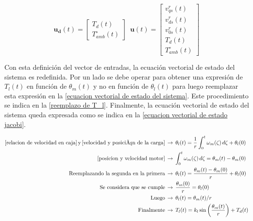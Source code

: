 \documentclass[a4paper, 10pt, onecolumn,journal]{ieeeconf}
\begin{document}
\begin{equation}
    \mathbf{u_{d}}(t) = \begin{bmatrix} T_d(t) \\ T_{amb}^{\circ}(t)\end{bmatrix}\, \, \, 
    \mathbf{u}(t) = \begin{bmatrix} v^r_{qs}(t) \\ v^r_{ds}(t) \\ v^r_{0s}(t) \\ T_d(t) \\ T_{amb}^{\circ}(t) \end{bmatrix}
    \label{vector de entradas jacobi linealizado}
\end{equation}

Con esta definición del vector de entradas, la ecuación vectorial de estado del sistema es redefinida.
Por un lado se debe operar para obtener una expresión de $T_l(t)$ en función de $\theta_m(t)$ y no en función de 
$\theta_l(t)$ para luego reemplazar esta expresión en la \cref{ecuacion vectorial de estado del sistema}.
Este procedimiento se indica en la \cref{reemplazo de T_l}. Finalmente, la ecuación vectorial de estado del sistema queda expresada
como se indica en la \cref{ecuacion vectorial de estado jacobi}.

\begin{equation}
    \begin{aligned}
        \cref{relacion de velocidad en caja} \,\text{y}\, \cref{velocidad y posición de la carga}\,&\rightarrow\,\theta_l(t) = \frac{1}{r} \int_{0}^{t} \omega_m(\zeta) \, d\zeta + \theta_l(0)\\
        \cref{posicion y velocidad motor}\,&\rightarrow\,  \int_{0}^{t} \omega_m(\zeta) \, d\zeta = \theta_m(t) - \theta_m(0)\\
        \text{Reemplazando la segunda en la primera}\,&\rightarrow\,\theta_l(t) = \frac{\theta_m(t) - \theta_m(0)}{r} + \theta_l(0)\\
        \text{Se considera que se cumple}\,&\rightarrow\,\frac{\theta_m(0)}{r} = \theta_l(0)\\
        \text{Luego}\,&\rightarrow\,\theta_l(t) = \theta_m(t)/r\\
        \text{Finalmente}\,&\rightarrow\,T_l(t) = k_l\sin\left(\frac{\theta_m(t)}{r}\right) + T_d(t)
    \end{aligned}
    \label{reemplazo de T_l}
\end{equation}
\end{document}
